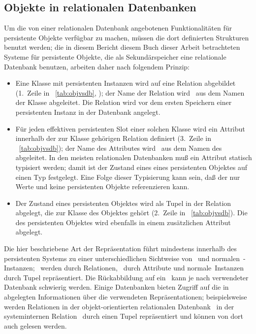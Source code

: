 \subsection{Objekte in relationalen Datenbanken}\label{sec:rdbpr}
%
Um die von einer relationalen Datenbank angebotenen
Funktionalit\"{a}ten f\"{u}r persistente Objekte verf\"{u}gbar zu
machen, m\"{u}ssen die dort definierten Strukturen benutzt werden; die
in \ifbericht diesem Bericht \else\ifbuch diesem Buch \else dieser
Arbeit \fi\fi betrachteten Systeme f\"{u}r persistente Objekte, die
als Sekund\"{a}rspeicher eine relationale Datenbank benutzen, arbeiten
daher nach folgendem Prinzip:
%
\begin{itemize}%
%
\item Eine Klasse mit persistenten Instanzen wird auf eine Relation
abgebildet (1.~Zeile in \tablename~\ref{tab:objvsdb},
\citepage{\pageref{tab:objvsdb}}); der Name der Relation wird \ia\ aus
dem Namen der Klasse abgeleitet. Die Relation wird vor dem ersten
Speichern einer persistenten Instanz in der Datenbank angelegt.
%
\item F\"{u}r jeden effektiven persistenten Slot einer solchen Klasse
wird ein Attribut innerhalb der zur Klasse geh\"{o}rigen Relation
definiert (3.~Zeile in \tablename~\ref{tab:objvsdb}); der Name des
Attributes wird \ia\ aus dem Namen des
\Slt[s]\/ abgeleitet. In den meisten relationalen Datenbanken mu\ss{} ein
Attribut statisch typisiert werden; damit ist der Zustand eines
\Slt[s]\/ eines persistenten Objektes auf einen Typ festgelegt. Eine
Folge dieser Typisierung kann sein, da\ss{} der \Slt\/ nur Werte und keine
persistenten Objekte referenzieren kann.
%
\item Der Zustand eines persistenten Objektes wird als Tupel in der
Relation abgelegt, die zur Klasse des Objektes geh\"{o}rt (2.~Zeile in
\tablename~\ref{tab:objvsdb}). Die \objid\/ des persistenten Objektes
wird ebenfalls in einem zus\"{a}tzlichen Attribut abgelegt.
%
\end{itemize}
%
Die hier beschriebene Art der Repr\"{a}sentation f\"{u}hrt mindestens
innerhalb des persistenten Systems zu einer unterschiedlichen
Sichtweise von \mo[en]\ und \rglq{}normalen\rgrq\ \clos-Instanzen;
\clsmo[e]\ werden durch Relationen, \sltmo[e]\ durch Attribute und
\rglq{}normale\rgrq\ Instanzen durch Tupel repr\"{a}sentiert. Die
R\"{u}ckabbildung auf ein \mo\ kann je nach verwendeter Datenbank
schwierig werden. Einige Datenbanken bieten Zugriff auf die in
\ \cite[]{bib:on94} abgelegten Informationen
\"{u}ber die verwendeten Repr\"{a}sentationen; beispielsweise werden
Relationen in der objekt-orientierten relationalen Datenbank
\postgres\ in der systeminternen Relation
\ durch einen Tupel  repr\"{a}sentiert 
\cite[]{bib:we93} und k\"{o}nnen von dort auch gelesen
werden.
%
